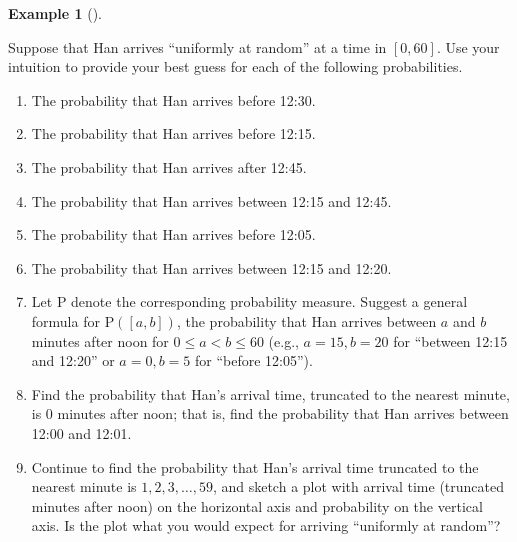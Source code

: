 \documentclass[
  letterpaper,
  DIV=11,
  numbers=noendperiod]{scrreprt}
\providecommand{\tightlist}{%
  \setlength{\itemsep}{0pt}\setlength{\parskip}{0pt}}
\theoremstyle{plain}
\theoremstyle{definition}
\newtheorem{example}{Example}[chapter]
\theoremstyle{definition}
\theoremstyle{definition}
\theoremstyle{remark}
\begin{document}
\begin{tcolorbox}[enhanced jigsaw, opacityback=0, left=2mm, colframe=quarto-callout-note-color-frame, toprule=.15mm, breakable, colback=white, leftrule=.75mm, arc=.35mm, rightrule=.15mm, bottomrule=.15mm]

\begin{example}[]\protect\hypertarget{exm-meeting-probspace1d-uniform}{}\label{exm-meeting-probspace1d-uniform}

Suppose that Han arrives ``uniformly at random'' at a time in
\([0, 60]\). Use your intuition to provide your best guess for each of
the following probabilities.

\begin{enumerate}
\def\labelenumi{\arabic{enumi}.}
\tightlist
\item
  The probability that Han arrives before 12:30.
\item
  The probability that Han arrives before 12:15.
\item
  The probability that Han arrives after 12:45.
\item
  The probability that Han arrives between 12:15 and 12:45.
\item
  The probability that Han arrives before 12:05.
\item
  The probability that Han arrives between 12:15 and 12:20.
\item
  Let \(\textrm{P}\) denote the corresponding probability measure.
  Suggest a general formula for \(\textrm{P}([a, b])\), the probability
  that Han arrives between \(a\) and \(b\) minutes after noon for
  \(0\le a<b\le 60\) (e.g., \(a=15, b=20\) for ``between 12:15 and
  12:20'' or \(a = 0, b=5\) for ``before 12:05'').
\item
  Find the probability that Han's arrival time, truncated to the nearest
  minute, is 0 minutes after noon; that is, find the probability that
  Han arrives between 12:00 and 12:01.
\item
  Continue to find the probability that Han's arrival time
  truncated\footnotemark{} to the nearest minute is
  \(1, 2, 3, \ldots, 59\), and sketch a plot with arrival time
  (truncated minutes after noon) on the horizontal axis and probability
  on the vertical axis. Is the plot what you would expect for arriving
  ``uniformly at random''?
\end{enumerate}

\end{example}

\end{tcolorbox}
\end{document}
